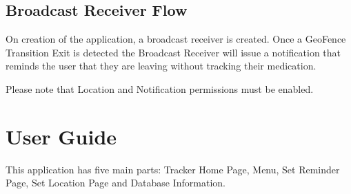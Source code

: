 \documentclass{article}
\begin{document}
\subsection{Broadcast Receiver Flow}
On creation of the application, a broadcast receiver is created. Once a GeoFence Transition Exit is detected the Broadcast Receiver will issue a notification that reminds the user that they are leaving without tracking their medication.

Please note that Location and Notification permissions must be enabled.

\section{User Guide}
This application has five main parts: Tracker Home Page, Menu, Set Reminder Page, Set Location Page and Database Information.
\end{document}
